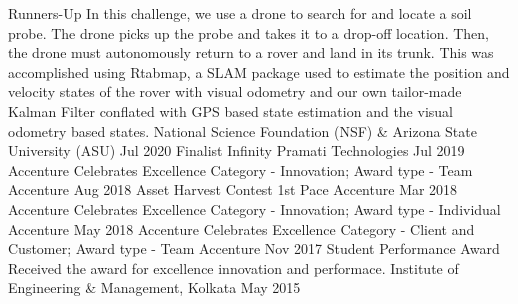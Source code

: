\begin{cvhonors}
	\cvhonor
	{Runners-Up}
	{In this challenge, we use a drone to search for and locate a soil probe. The drone picks up the probe and takes it to a drop-off location. Then, the drone must autonomously return to a rover and land in its trunk. This was accomplished using Rtabmap, a SLAM package used to estimate the position and velocity states of the rover with visual odometry and our own tailor-made Kalman Filter conflated with GPS based state estimation and the visual odometry based states.}
	{National Science Foundation (NSF) \& Arizona State University (ASU)}
	{Jul 2020}
	\cvhonor
	{Finalist}
	{Infinity}
	{Pramati Technologies}
	{Jul 2019}
	\cvhonor
	{Accenture Celebrates Excellence}
	{Category - Innovation; Award type - Team}
	{Accenture}
	{Aug 2018}
	\cvhonor
	{Asset Harvest Contest}
	{1st Pace}
	{Accenture}
	{Mar 2018}
	\cvhonor
	{Accenture Celebrates Excellence}
	{Category - Innovation; Award type - Individual}
	{Accenture}
	{May 2018}
	\cvhonor
	{Accenture Celebrates Excellence}
	{Category - Client and Customer; Award type - Team}
	{Accenture}
	{Nov 2017}
	\cvhonor
	{Student Performance Award}
	{Received the award for excellence innovation and performace.}
	{Institute of Engineering \& Management, Kolkata}
	{May 2015}
\end{cvhonors}